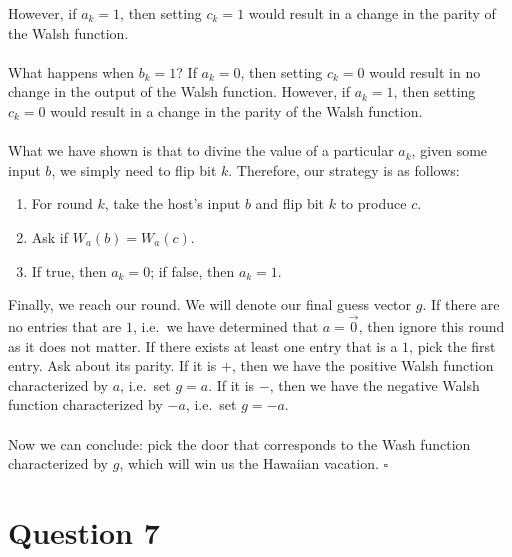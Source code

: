 \documentclass[letterpaper]{article}
\newcommand*{\QED}{\hfill\ensuremath{\square}}%
\begin{document}
However, if $ a_k = 1 $, then setting $ c_k = 1 $ would result in a change in the parity of the Walsh function.
\\ \\
What happens when $ b_k = 1 $?
If $ a_k = 0 $, then setting $ c_k = 0 $ would result in no change in the output of the Walsh function.
However, if $ a_k = 1 $, then setting $ c_k = 0 $ would result in a change in the parity of the Walsh function.
\\ \\
What we have shown is that to divine the value of a particular $ a_k $, given some input $ b $, we simply need to flip bit $ k $.
Therefore, our strategy is as follows:
\begin{enumerate}
    \item For round $ k $, take the host's input $ b $ and flip bit $ k $ to produce $ c $.
    \item Ask if $ W_a(b) = W_a(c) $.
    \item If true, then $ a_k = 0 $; if false, then $ a_k = 1 $.
\end{enumerate}

Finally, we reach our  round.
We will denote our final guess vector $ g $.
If there are no entries that are $ 1 $, i.e.\ we have determined that $ a = \vec{0} $, then ignore this round as it does not matter.
If there exists at least one entry that is a $ 1 $, pick the first entry.
Ask about its parity.
If it is $ + $, then we have the positive Walsh function characterized by $ a $, i.e.\ set $ g = a $.
If it is $ - $, then we have the negative Walsh function characterized by $ -a $, i.e.\ set $ g = -a $.
\\ \\
Now we can conclude: pick the door that corresponds to the Wash function characterized by $ g $, which will win us the Hawaiian vacation.
\QED{}

\section{Question 7}
\label{sec:Question7}
\end{document}
